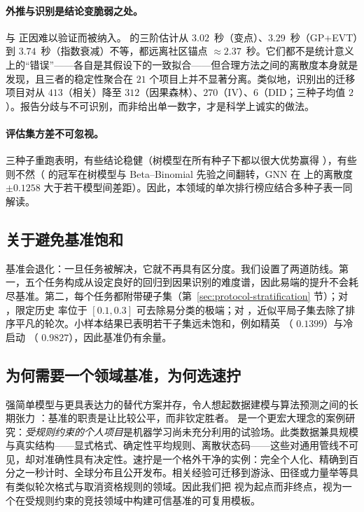 \paragraph{外推与识别是结论变脆弱之处。} 与  正因难以验证而被纳入。 的三阶估计从 $3.02$~秒（变点）、$3.29$~秒（GP+EVT）到 $3.74$~秒（指数衰减）不等，都远离社区锚点 $\approx 2.37$~秒。它们都不是统计意义上的“错误”——各自是其假设下的一致拟合——但合理方法之间的离散度本身就是发现，且三者的稳定性聚合在 $21$ 个项目上并不显著分离。类似地，识别出的迁移项目对从 $413$（相关）降至 $312$（因果森林）、$270$（IV）、$6$（DID；三种子均值 $2$）。报告分歧与不可识别，而非给出单一数字，才是科学上诚实的做法。

\paragraph{评估集方差不可忽视。}三种子重跑表明，有些结论稳健（树模型在所有种子下都以很大优势赢得 ），有些则不然（ 的冠军在树模型与 Beta--Binomial 先验之间翻转，GNN 在  上的离散度 $\pm0.1258$ 大于若干模型间差距）。因此，本领域的单次排行榜应结合多种子表一同解读。

\subsection{关于避免基准饱和}
\label{sec:disc-saturation}

基准会退化：一旦任务被解决，它就不再具有区分度。我们设置了两道防线。第一，五个任务构成从设定良好的回归到因果识别的难度谱，因此易端的提升不会耗尽基准。第二，每个任务都附带硬子集（第~\ref{sec:protocol-stratification} 节）；对 ，限定历史 \DNF{} 率位于 $[0.1,0.3]$ 可去除易分类的极端；对 ，近似平局子集去除了排序平凡的轮次。小样本结果已表明若干子集远未饱和，例如精英 （\aucpr{} $0.1399$）与冷启动 （\maelog{} $0.9827$），因此基准仍有余量。

\subsection{为何需要一个领域基准，为何选速拧}
\label{sec:disc-domain}

强简单模型与更具表达力的替代方案并存，令人想起数据建模与算法预测之间的长期张力 \citep{breiman_cultures}：基准的职责是让比较公平，而非钦定胜者。\wcabench{} 是一个更宏大理念的案例研究：\emph{受规则约束的个人项目}是机器学习尚未充分利用的试验场。此类数据兼具规模与真实结构——显式格式、确定性平均规则、离散状态码——这些对通用管线不可见，却对准确性具有决定性。速拧是一个格外干净的实例：完全个人化、精确到百分之一秒计时、全球分布且公开发布。相关经验可迁移到游泳、田径或力量举等具有类似轮次格式与取消资格规则的领域。因此我们把 \wcabench{} 视为起点而非终点，视为一个在受规则约束的竞技领域中构建可信基准的可复用模板。

